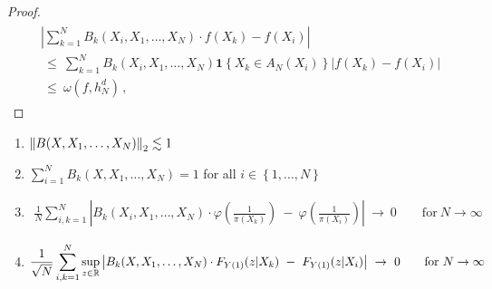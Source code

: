 \begin{proof}
  \begin{align}
   \begin{split}
   &
   \left|
  \sum_{k=1}^{N}
    B_k(X_i,X_1,\ldots,X_N)\cdot 
    f(X_k)
    -
    f(X_i)
   \right|
   \\
   &
   \ 
   \le
   \ 
  \sum_{k=1}^{N}
    B_k(X_i,X_1,\ldots,X_N)
    \mathbf{1}\left\{
      X_k\in A_N(X_i)
    \right\}
    \left|
    f(X_k)
    -
    f(X_i)
    \right|
   \\
   &
   \ 
   \le
   \ 
   \omega
   \left(
    f,h_N^d
   \right)
   \,,
   \end{split}
 \end{align}

\end{proof}

\begin{lemma}
  \begin{enumerate}[label=(\roman*)]
    \item
      $\left\lVert B(X,X_1,\ldots,X_N)\right\rVert_2\lesssim 1$ 
      \item
      $
      \sum_{i=1}^{N}
        B_k(X,X_1,\ldots,X_N)
        =1
      $
      for all $i\in \left\{
        1,\ldots,N
      \right\}$
      \item
      \begin{align*}
        \frac
        {1}
        {N}
        \sum_{i,k=1}^{N}
            \left|
        B_k(X_i,X_1,\ldots,X_N)
        \cdot
            \varphi
            \left(
              \frac
              {1}
              {\pi(X_k)}
            \right)
            \ 
            -
            \ 
            \varphi
            \left(
              \frac
              {1}
              {\pi(X_i)}
            \right)
            \right|
            \ 
            \to
            \ 
            0
            \qquad
            \text{for}
            \ 
            N\to\infty
          \end{align*}
\item
      \begin{align*}
        \frac
        {1}
        {\sqrt{N}}
        \sum_{i,k=1}^{N}
        \sup_{z\in\R}
            \left|
        B_k(X,X_1,\ldots,X_N)
        \cdot
        F_{Y(1)}(z|X_k)
            \ 
            -
            \ 
        F_{Y(1)}(z|X_i)
            \right|
            \ 
            \to
            \ 
            0
            \qquad
            \text{for}
            \ 
            N\to\infty
      \end{align*}
\end{enumerate}
\end{lemma}
